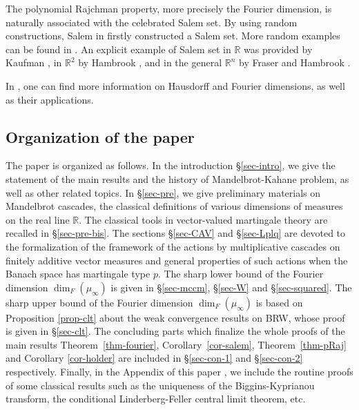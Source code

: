 \documentclass[12pt]{amsart}
\theoremstyle{definition}
\theoremstyle{remark}
\newcommand{\R}{\mathbb{R}}
\numberwithin{equation}{section}
\begin{document}
The polynomial Rajchman property, more precisely the Fourier dimension, is naturally associated with the celebrated Salem set. 
By using random constructions, Salem in \cite{Sal51} firstly constructed a Salem set. More random examples can be  found in \cite{Kahane-book, Blu99, SX06, LP09, Eks16, FS18}. An explicit example of Salem set in $\mathbb{R}$ was provided by Kaufman \cite{Kau81}, in $\mathbb{R}^2$ by Hambrook \cite{Ham17}, and in the general $\mathbb{R}^n$ by Fraser and Hambrook \cite{FH23}.

In \cite{BBS, Fal86, Mattila, Wolff}, one can find  more information on Hausdorff and Fourier dimensions, as well as their applications.


\subsection{Organization of the paper}

The paper is organized as follows.   In the introduction  \S \ref{sec-intro}, we give the statement of the main results and the  history of Mandelbrot-Kahane problem, as well as other related topics.  In \S \ref{sec-pre}, we give preliminary  materials on Mandelbrot cascades, the  classical definitions of  various dimensions of measures on the real line $\R$.  The classical tools in vector-valued  martingale theory are recalled in \S \ref{sec-pre-bis}.   The sections \S \ref{sec-CAV} and \S\ref{sec-Lplq} are devoted to the  formalization of  the framework of the actions by multiplicative cascades on finitely additive vector measures and general properties of such actions when the Banach space has martingale type $p$.  The sharp lower bound of the Fourier dimension $\dim_F(\mu_\infty)$ is given in  \S \ref{sec-mccm}, \S\ref{sec-W} and \S \ref{sec-squared}.    The sharp upper bound of the Fourier dimension $\dim_F(\mu_\infty)$ is based on   Proposition \ref{prop-clt} about the  weak convergence results on BRW, whose proof is  given  in \S \ref{sec-clt}.     The concluding parts which finalize the whole proofs of the main results Theorem~\ref{thm-fourier}, Corollary~\ref{cor-salem}, Theorem~\ref{thm-pRaj} and Corollary \ref{cor-holder} are included in \S \ref{sec-con-1} and \S \ref{sec-con-2} respectively.  Finally, in the Appendix  of this paper , we include the routine proofs of some classical results such as  the uniqueness of the Biggins-Kyprianou transform, the conditional Linderberg-Feller central limit theorem, etc. 
 
\end{document}
